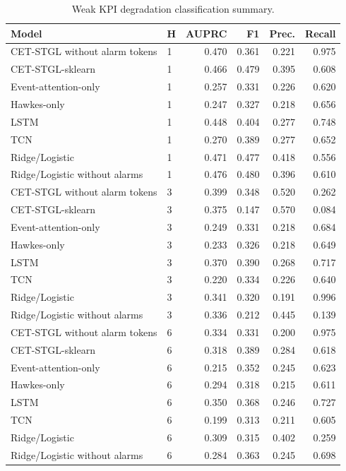 \begin{table}[t]
\centering
\caption{Weak KPI degradation classification summary.}
\label{tab:classification_main}
\scriptsize
\setlength{\tabcolsep}{4pt}
\begin{tabular}{llrrrr}
\toprule
Model & H & AUPRC & F1 & Prec. & Recall \\
\midrule
CET-STGL without alarm tokens & 1 & 0.470 & 0.361 & 0.221 & 0.975 \\
CET-STGL-sklearn & 1 & 0.466 & 0.479 & 0.395 & 0.608 \\
Event-attention-only & 1 & 0.257 & 0.331 & 0.226 & 0.620 \\
Hawkes-only & 1 & 0.247 & 0.327 & 0.218 & 0.656 \\
LSTM & 1 & 0.448 & 0.404 & 0.277 & 0.748 \\
TCN & 1 & 0.270 & 0.389 & 0.277 & 0.652 \\
Ridge/Logistic & 1 & 0.471 & 0.477 & 0.418 & 0.556 \\
Ridge/Logistic without alarms & 1 & 0.476 & 0.480 & 0.396 & 0.610 \\
CET-STGL without alarm tokens & 3 & 0.399 & 0.348 & 0.520 & 0.262 \\
CET-STGL-sklearn & 3 & 0.375 & 0.147 & 0.570 & 0.084 \\
Event-attention-only & 3 & 0.249 & 0.331 & 0.218 & 0.684 \\
Hawkes-only & 3 & 0.233 & 0.326 & 0.218 & 0.649 \\
LSTM & 3 & 0.370 & 0.390 & 0.268 & 0.717 \\
TCN & 3 & 0.220 & 0.334 & 0.226 & 0.640 \\
Ridge/Logistic & 3 & 0.341 & 0.320 & 0.191 & 0.996 \\
Ridge/Logistic without alarms & 3 & 0.336 & 0.212 & 0.445 & 0.139 \\
CET-STGL without alarm tokens & 6 & 0.334 & 0.331 & 0.200 & 0.975 \\
CET-STGL-sklearn & 6 & 0.318 & 0.389 & 0.284 & 0.618 \\
Event-attention-only & 6 & 0.215 & 0.352 & 0.245 & 0.623 \\
Hawkes-only & 6 & 0.294 & 0.318 & 0.215 & 0.611 \\
LSTM & 6 & 0.350 & 0.368 & 0.246 & 0.727 \\
TCN & 6 & 0.199 & 0.313 & 0.211 & 0.605 \\
Ridge/Logistic & 6 & 0.309 & 0.315 & 0.402 & 0.259 \\
Ridge/Logistic without alarms & 6 & 0.284 & 0.363 & 0.245 & 0.698 \\

\end{tabular}
\end{table}
